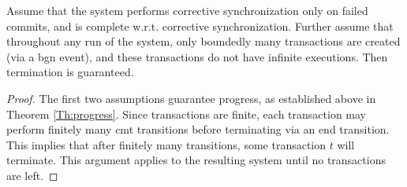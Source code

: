 \begin{lemma}[Termination]
	Assume that the system performs corrective synchronization only on failed commits, and is complete w.r.t. corrective synchronization. Further assume that throughout any run of the system, only boundedly many transactions are created (via a {\sf bgn} event), and these transactions do not have infinite executions. Then termination is guaranteed. \vspace{3pt}
	\begin{proof}
		The first two assumptions guarantee progress, as established above in 
		Theorem \ref{Th:progress}. Since transactions are finite, each transaction may perform finitely many {\sf cmt} transitions before terminating via an {\sf end} transition. This implies that after finitely many transitions, some transaction $t$ will terminate. This argument applies to the resulting system until no transactions are left.
	\end{proof}
\end{lemma}


%
%

